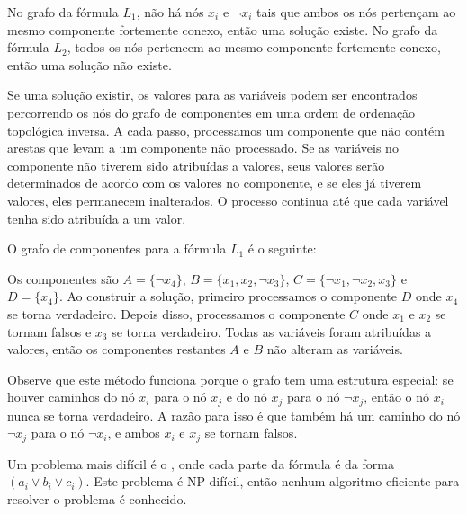 No grafo da fórmula $L_1$,
não há nós $x_i$ e $\lnot x_i$
tais que ambos os nós 
pertençam ao mesmo componente fortemente conexo,
então uma solução existe.
No grafo da fórmula $L_2$,
todos os nós pertencem ao mesmo componente fortemente conexo,
então uma solução não existe.

Se uma solução existir, os valores para as variáveis
podem ser encontrados percorrendo os nós do
grafo de componentes em uma ordem de ordenação topológica inversa.
A cada passo, processamos um componente 
que não contém arestas que levam a um
componente não processado.
Se as variáveis no componente
não tiverem sido atribuídas a valores,
seus valores serão determinados
de acordo com os valores no componente,
e se eles já tiverem valores,
eles permanecem inalterados.
O processo continua até que cada variável
tenha sido atribuída a um valor.

O grafo de componentes para a fórmula $L_1$ é o seguinte:
\begin{center}
\end{center}

Os componentes são
$A = \{\lnot x_4\}$,
$B = \{x_1, x_2, \lnot x_3\}$,
$C = \{\lnot x_1, \lnot x_2, x_3\}$ e
$D = \{x_4\}$.
Ao construir a solução,
primeiro processamos o componente $D$
onde $x_4$ se torna verdadeiro.
Depois disso, processamos o componente $C$
onde $x_1$ e $x_2$ se tornam falsos
e $x_3$ se torna verdadeiro.
Todas as variáveis foram atribuídas a valores,
então os componentes restantes $A$ e $B$
não alteram as variáveis.

Observe que este método funciona porque o
grafo tem uma estrutura especial:
se houver caminhos do nó $x_i$ para o nó $x_j$
e do nó $x_j$ para o nó $\lnot x_j$,
então o nó $x_i$ nunca se torna verdadeiro.
A razão para isso é que também há
um caminho do nó $\lnot x_j$ para o nó $\lnot x_i$,
e ambos $x_i$ e $x_j$ se tornam falsos.


Um problema mais difícil é o ,
onde cada parte da fórmula é da forma
$(a_i \lor b_i \lor c_i)$.
Este problema é NP-difícil, então nenhum algoritmo eficiente
para resolver o problema é conhecido.
